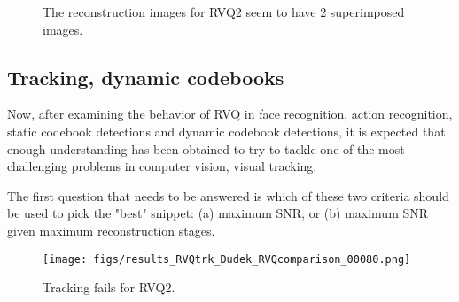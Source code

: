 								\begin{figure}[t]
								\centering	
								\caption{The reconstruction images for RVQ2 seem to have 2 superimposed images.}										
								\label{fig:results_RVQtrk_comparison_RVQ1_RVQ2}				
								\end{figure}

\subsection{Tracking, dynamic codebooks}
Now, after examining the behavior of RVQ in face recognition, action recognition, static codebook detections and dynamic codebook detections, it is expected that enough understanding has been obtained to try to tackle one of the most challenging problems in computer vision, visual tracking.

The first question that needs to be answered is which of these two criteria should be used to pick the "best" snippet: (a) maximum SNR, or (b) maximum SNR given maximum reconstruction stages.

								\begin{figure}[t]
								\centering
								\texttt{[image: figs/results\_RVQtrk\_Dudek\_RVQcomparison\_00080.png]}
								\caption{Tracking fails for RVQ2.}
								\label{fig:results_RVQtrk_Dudek_RVQcomparison_00080}
								\end{figure}



